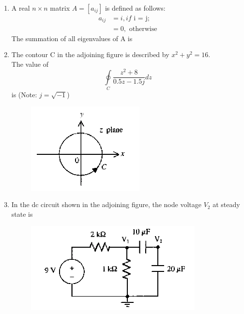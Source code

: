 \documentclass[journal,12pt,onecolumn]{IEEEtran}
\theoremstyle{remark}
\begin{document}
\begin{enumerate}
\item A real $n \times n$ matrix $A = [a_{ij}]$ is defined as follows: \newline 
\begin{align*}
    a_{ij} &=i, if \text{ i = j}; \\
    &= 0, \text{ otherwise}
\end{align*}
The summation of all eigenvalues of A is

\hfill{}
\begin{enumerate}
\end{enumerate}

\item The contour C in the adjoining figure is described by $x^2 + y^2 = 16$.\\ 
The value of \[\oint\limits_{C} \frac{z^2+8}{0.5z - 1.5j} dz\] is (Note: $j = \sqrt{-1}$)
\begin{figure}[H]
    \centering
    \includegraphics[scale=0.75]{q14}
    \caption*{}
    \label{fig:placeholder}
\end{figure}
\hfill{}
\begin{enumerate}
\end{enumerate}

\item In the dc circuit shown in the adjoining figure, the node voltage $V_2$ at steady state is
\begin{figure}[h]
    \centering
    \includegraphics[scale=0.75]{q15}
    \caption*{}
    \label{fig:placeholder}
\end{figure}


\end{enumerate}
\end{document}
